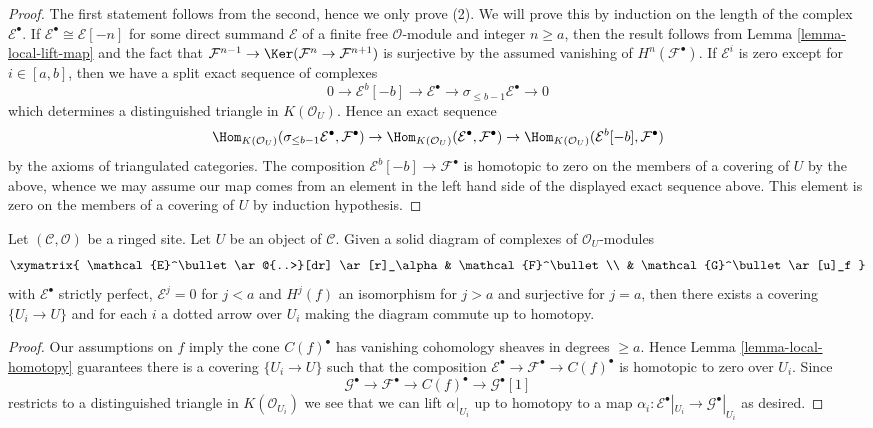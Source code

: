 \begin{proof}
The first statement follows from the second, hence we only prove (2).
We will prove this by induction on the length of the complex
$\mathcal{E}^\bullet$. If $\mathcal{E}^\bullet \cong \mathcal{E}[-n]$
for some direct summand $\mathcal{E}$ of a finite free
$\mathcal{O}$-module and integer $n \geq a$, then the result follows from
Lemma \ref{lemma-local-lift-map} and the fact that
$\mathcal{F}^{n - 1} \to \Ker(\mathcal{F}^n \to \mathcal{F}^{n + 1})$
is surjective by the assumed vanishing of $H^n(\mathcal{F}^\bullet)$.
If $\mathcal{E}^i$ is zero except for $i \in [a, b]$, then we have a
split exact sequence of complexes
$$
0 \to \mathcal{E}^b[-b] \to \mathcal{E}^\bullet \to
\sigma_{\leq b - 1}\mathcal{E}^\bullet \to 0
$$
which determines a distinguished triangle in
$K(\mathcal{O}_U)$. Hence an exact sequence
$$
\Hom_{K(\mathcal{O}_U)}(
\sigma_{\leq b - 1}\mathcal{E}^\bullet, \mathcal{F}^\bullet)
\to
\Hom_{K(\mathcal{O}_U)}(\mathcal{E}^\bullet, \mathcal{F}^\bullet)
\to
\Hom_{K(\mathcal{O}_U)}(\mathcal{E}^b[-b], \mathcal{F}^\bullet)
$$
by the axioms of triangulated categories. The composition
$\mathcal{E}^b[-b] \to \mathcal{F}^\bullet$ is homotopic to zero
on the members of a covering of $U$ by the above,
whence we may assume our map comes from an element in the
left hand side of the displayed exact sequence above. This element
is zero on the members of a covering of $U$ by induction hypothesis.
\end{proof}

\begin{lemma}
\label{lemma-lift-through-quasi-isomorphism}
Let $(\mathcal{C}, \mathcal{O})$ be a ringed site. Let $U$ be an object of
$\mathcal{C}$. Given a solid diagram of complexes of $\mathcal{O}_U$-modules
$$
\xymatrix{
\mathcal{E}^\bullet \ar@{..>}[dr] \ar[r]_\alpha & \mathcal{F}^\bullet \\
& \mathcal{G}^\bullet \ar[u]_f
}
$$
with $\mathcal{E}^\bullet$ strictly perfect, $\mathcal{E}^j = 0$ for
$j < a$ and $H^j(f)$ an isomorphism for $j > a$ and surjective for
$j = a$, then there exists a covering $\{U_i \to U\}$ and for each $i$
a dotted arrow over $U_i$ making the diagram commute up to homotopy.
\end{lemma}

\begin{proof}
Our assumptions on $f$ imply the cone $C(f)^\bullet$ has vanishing
cohomology sheaves in degrees $\geq a$.
Hence Lemma \ref{lemma-local-homotopy} guarantees there is a
covering $\{U_i \to U\}$ such that the composition
$\mathcal{E}^\bullet \to \mathcal{F}^\bullet \to C(f)^\bullet$
is homotopic to zero over $U_i$. Since
$$
\mathcal{G}^\bullet \to \mathcal{F}^\bullet \to C(f)^\bullet \to
\mathcal{G}^\bullet[1]
$$
restricts to a distinguished triangle in $K(\mathcal{O}_{U_i})$
we see that we can lift $\alpha|_{U_i}$ up to homotopy to a map
$\alpha_i : \mathcal{E}^\bullet|_{U_i} \to \mathcal{G}^\bullet|_{U_i}$
as desired.
\end{proof}

